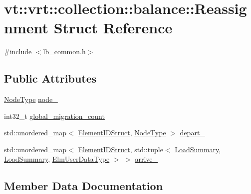 \hypertarget{structvt_1_1vrt_1_1collection_1_1balance_1_1_reassignment}{}\section{vt\+:\+:vrt\+:\+:collection\+:\+:balance\+:\+:Reassignment Struct Reference}
\label{structvt_1_1vrt_1_1collection_1_1balance_1_1_reassignment}


{\ttfamily \#include $<$lb\+\_\+common.\+h$>$}

\subsection*{Public Attributes}
\begin{DoxyCompactItemize}
\item 
\hyperlink{namespacevt_a866da9d0efc19c0a1ce79e9e492f47e2}{Node\+Type} \hyperlink{structvt_1_1vrt_1_1collection_1_1balance_1_1_reassignment_ab94b05ac3a28d21a1f189f4becbe1240}{node\+\_\+}
\item 
int32\+\_\+t \hyperlink{structvt_1_1vrt_1_1collection_1_1balance_1_1_reassignment_a4887608a57a19a896481f22d2ad11ce2}{global\+\_\+migration\+\_\+count}
\item 
std\+::unordered\+\_\+map$<$ \hyperlink{namespacevt_1_1vrt_1_1collection_1_1balance_a9f5b53fafb270212279a4757d2c4cd28}{Element\+I\+D\+Struct}, \hyperlink{namespacevt_a866da9d0efc19c0a1ce79e9e492f47e2}{Node\+Type} $>$ \hyperlink{structvt_1_1vrt_1_1collection_1_1balance_1_1_reassignment_a8fa0e732209e0f186eb10a15b29a0914}{depart\+\_\+}
\item 
std\+::unordered\+\_\+map$<$ \hyperlink{namespacevt_1_1vrt_1_1collection_1_1balance_a9f5b53fafb270212279a4757d2c4cd28}{Element\+I\+D\+Struct}, std\+::tuple$<$ \hyperlink{structvt_1_1vrt_1_1collection_1_1balance_1_1_load_summary}{Load\+Summary}, \hyperlink{structvt_1_1vrt_1_1collection_1_1balance_1_1_load_summary}{Load\+Summary}, \hyperlink{namespacevt_1_1vrt_1_1collection_1_1balance_abf9eea0f4c24e41036ab844025e7d4c8}{Elm\+User\+Data\+Type} $>$ $>$ \hyperlink{structvt_1_1vrt_1_1collection_1_1balance_1_1_reassignment_ae63302fc33cb904a26051e72bf98430a}{arrive\+\_\+}
\end{DoxyCompactItemize}


\subsection{Member Data Documentation}
\mbox{\label{structvt_1_1vrt_1_1collection_1_1balance_1_1_reassignment_ae63302fc33cb904a26051e72bf98430a}} 
